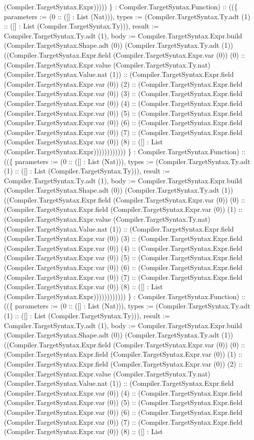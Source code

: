 \documentclass[11pt]{article}
\begin{document}
(Compiler.TargetSyntax.Expr))))) \} : Compiler.TargetSyntax.Function) :: ((\{ parameters := (0 :: ([] : List (Nat))), types := (Compiler.TargetSyntax.Ty.adt (1) :: ([] : List (Compiler.TargetSyntax.Ty))), result := Compiler.TargetSyntax.Ty.adt (1), body := Compiler.TargetSyntax.Expr.build (Compiler.TargetSyntax.Shape.adt (0)) (Compiler.TargetSyntax.Ty.adt (1)) ((Compiler.TargetSyntax.Expr.field (Compiler.TargetSyntax.Expr.var (0)) (0) :: (Compiler.TargetSyntax.Expr.value (Compiler.TargetSyntax.Ty.nat) (Compiler.TargetSyntax.Value.nat (1)) :: (Compiler.TargetSyntax.Expr.field (Compiler.TargetSyntax.Expr.var (0)) (2) :: (Compiler.TargetSyntax.Expr.field (Compiler.TargetSyntax.Expr.var (0)) (3) :: (Compiler.TargetSyntax.Expr.field (Compiler.TargetSyntax.Expr.var (0)) (4) :: (Compiler.TargetSyntax.Expr.field (Compiler.TargetSyntax.Expr.var (0)) (5) :: (Compiler.TargetSyntax.Expr.field (Compiler.TargetSyntax.Expr.var (0)) (6) :: (Compiler.TargetSyntax.Expr.field (Compiler.TargetSyntax.Expr.var (0)) (7) :: (Compiler.TargetSyntax.Expr.field (Compiler.TargetSyntax.Expr.var (0)) (8) :: ([] : List (Compiler.TargetSyntax.Expr)))))))))))) \} : Compiler.TargetSyntax.Function) :: ((\{ parameters := (0 :: ([] : List (Nat))), types := (Compiler.TargetSyntax.Ty.adt (1) :: ([] : List (Compiler.TargetSyntax.Ty))), result := Compiler.TargetSyntax.Ty.adt (1), body := Compiler.TargetSyntax.Expr.build (Compiler.TargetSyntax.Shape.adt (0)) (Compiler.TargetSyntax.Ty.adt (1)) ((Compiler.TargetSyntax.Expr.field (Compiler.TargetSyntax.Expr.var (0)) (0) :: (Compiler.TargetSyntax.Expr.field (Compiler.TargetSyntax.Expr.var (0)) (1) :: (Compiler.TargetSyntax.Expr.value (Compiler.TargetSyntax.Ty.nat) (Compiler.TargetSyntax.Value.nat (1)) :: (Compiler.TargetSyntax.Expr.field (Compiler.TargetSyntax.Expr.var (0)) (3) :: (Compiler.TargetSyntax.Expr.field (Compiler.TargetSyntax.Expr.var (0)) (4) :: (Compiler.TargetSyntax.Expr.field (Compiler.TargetSyntax.Expr.var (0)) (5) :: (Compiler.TargetSyntax.Expr.field (Compiler.TargetSyntax.Expr.var (0)) (6) :: (Compiler.TargetSyntax.Expr.field (Compiler.TargetSyntax.Expr.var (0)) (7) :: (Compiler.TargetSyntax.Expr.field (Compiler.TargetSyntax.Expr.var (0)) (8) :: ([] : List (Compiler.TargetSyntax.Expr)))))))))))) \} : Compiler.TargetSyntax.Function) :: ((\{ parameters := (0 :: ([] : List (Nat))), types := (Compiler.TargetSyntax.Ty.adt (1) :: ([] : List (Compiler.TargetSyntax.Ty))), result := Compiler.TargetSyntax.Ty.adt (1), body := Compiler.TargetSyntax.Expr.build (Compiler.TargetSyntax.Shape.adt (0)) (Compiler.TargetSyntax.Ty.adt (1)) ((Compiler.TargetSyntax.Expr.field (Compiler.TargetSyntax.Expr.var (0)) (0) :: (Compiler.TargetSyntax.Expr.field (Compiler.TargetSyntax.Expr.var (0)) (1) :: (Compiler.TargetSyntax.Expr.field (Compiler.TargetSyntax.Expr.var (0)) (2) :: (Compiler.TargetSyntax.Expr.value (Compiler.TargetSyntax.Ty.nat) (Compiler.TargetSyntax.Value.nat (1)) :: (Compiler.TargetSyntax.Expr.field (Compiler.TargetSyntax.Expr.var (0)) (4) :: (Compiler.TargetSyntax.Expr.field (Compiler.TargetSyntax.Expr.var (0)) (5) :: (Compiler.TargetSyntax.Expr.field (Compiler.TargetSyntax.Expr.var (0)) (6) :: (Compiler.TargetSyntax.Expr.field (Compiler.TargetSyntax.Expr.var (0)) (7) :: (Compiler.TargetSyntax.Expr.field (Compiler.TargetSyntax.Expr.var (0)) (8) :: ([] : List 
\end{document}
